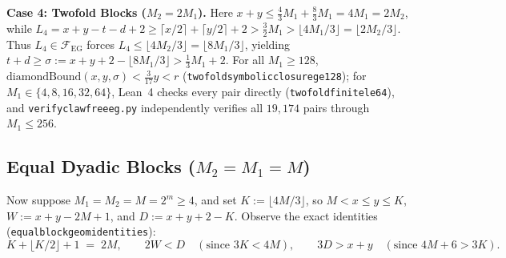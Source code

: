 \documentclass[11pt,reqno]{amsart}
\theoremstyle{plain}
\theoremstyle{definition}
\theoremstyle{remark}
\newcommand{\FEG}{\mathcal{F}_{\mathrm{EG}}}
\DeclareRobustCommand{\_}{\ifmmode\text{\textunderscore}\else\textunderscore\allowbreak\fi}
\begin{document}
\medskip
\noindent\textbf{Case 4: Twofold Blocks ($M_2 = 2 M_1$).}
Here $x + y \le \frac{4}{3} M_1 + \frac{8}{3} M_1 = 4 M_1 = 2 M_2$, while $L_4 = x + y - t - d + 2 \ge \lceil x/2 \rceil + \lceil y/2 \rceil + 2 > \frac{3}{2} M_1 > \lfloor 4M_1/3 \rfloor = \lfloor 2 M_2 / 3 \rfloor$. Thus $L_4 \in \FEG$ forces $L_4 \le \lfloor 4M_2/3 \rfloor = \lfloor 8M_1/3 \rfloor$, yielding $t + d \ge \sigma := x + y + 2 - \lfloor 8M_1/3 \rfloor > \frac{1}{3} M_1 + 2$. For all $M_1 \ge 128$, $\mathrm{diamondBound}(x, y, \sigma) < \frac{3}{17} y < r$ (\texttt{twofold\_symbolic\_closure\_ge128}); for $M_1 \in \{4, 8, 16, 32, 64\}$, Lean~4 checks every pair directly (\texttt{twofold\_finite\_le64}), and \texttt{verify\_clawfree\_eg.py} independently verifies all $19{,}174$ pairs through $M_1 \le 256$.

\subsection{Equal Dyadic Blocks (\texorpdfstring{$M_2 = M_1 = M$}{M2 = M1 = M})}\label{subsec:equal}

Now suppose $M_1 = M_2 = M = 2^m \ge 4$, and set $K := \lfloor 4M/3 \rfloor$, so $M < x \le y \le K$, $W := x + y - 2M + 1$, and $D := x + y + 2 - K$. Observe the exact identities (\texttt{equal\_block\_geom\_identities}):
\[
  K + \lfloor K/2 \rfloor + 1 \;=\; 2M, \qquad 2W < D \quad(\text{since } 3K < 4M), \qquad 3D > x + y \quad(\text{since } 4M + 6 > 3K).
\]
\end{document}
